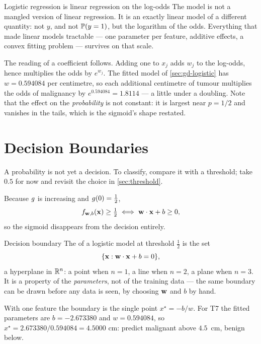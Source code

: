 \begin{keyinsight}{Logistic regression is linear regression on the log-odds}
The model is not a mangled version of linear regression. It is an exactly linear
model of a different quantity: not $y$, and not $\mathbb{P}(y=1)$, but the logarithm
of the odds. Everything that made linear models tractable --- one parameter per
feature, additive effects, a convex fitting problem --- survives on that scale.

The reading of a coefficient follows. Adding one to $x_j$ adds $w_j$ to the
log-odds, hence multiplies the odds by $e^{w_j}$. The fitted model of
\cref{sec:gd-logistic} has $w = 0.594084$ per centimetre, so each additional
centimetre of tumour multiplies the odds of malignancy by
$e^{0.594084} = 1.8114$ --- a little under a doubling. Note that the effect on
the \emph{probability} is not constant: it is largest near $p = 1/2$ and
vanishes in the tails, which is the sigmoid's shape restated.
\end{keyinsight}

\section{Decision Boundaries}
\label{sec:decision-boundary}

A probability is not yet a decision. To classify, compare it with a threshold;
take $0.5$ for now and revisit the choice in \cref{sec:threshold}.

Because $g$ is increasing and $g(0) = \tfrac12$,
\[
  f_{\mathbf{w},b}(\mathbf{x}) \ge \tfrac12
  \;\Longleftrightarrow\;
  \mathbf{w}\cdot\mathbf{x} + b \ge 0 ,
\]
so the sigmoid disappears from the decision entirely.

\begin{defbox}{Decision boundary}
The  of a logistic model at threshold $\tfrac12$ is the
set
\[
  \{\mathbf{x} : \mathbf{w}\cdot\mathbf{x} + b = 0\},
\]
a hyperplane in $\mathbb{R}^{n}$: a point when $n=1$, a line when $n=2$, a plane when
$n=3$. It is a property of the \emph{parameters}, not of the training data ---
the same boundary can be drawn before any data is seen, by choosing $\mathbf{w}$ and
$b$ by hand.
\end{defbox}

With one feature the boundary is the single point $x^\star = -b/w$. For T7 the
fitted parameters are $b = -2.673380$ and $w = 0.594084$, so
$x^\star = 2.673380/0.594084 = 4.5000$ cm: predict malignant above $4.5$~cm,
benign below.

